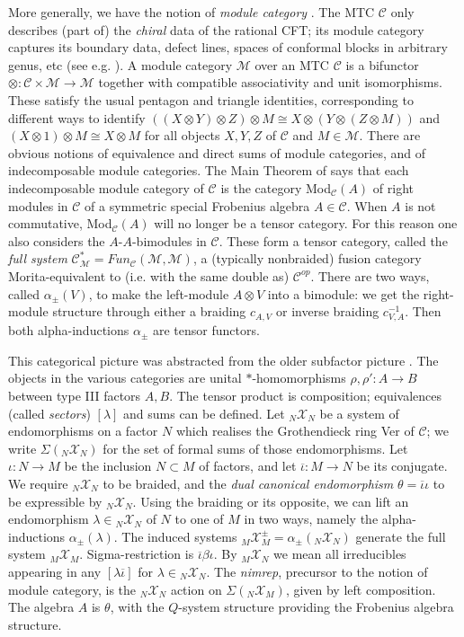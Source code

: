 \documentclass[12pt]{article}
\numberwithin{equation}{section}
\def\cC            {{\mathcal{C}}}
\def\cM            {{\mathcal{M}}}
\def\MXN           {{}_M {\mathcal{X}}_N}
\def\MXM           {{}_M {\mathcal{X}}_M}
\def\MXMpm         {{}_M^{} {\mathcal{X}}_M^\pm}
\def\NXN           {{}_N {\mathcal{X}}_N}
\def\NXM           {{}_N {\mathcal{X}}_M}
\begin{document}
More generally, we have the notion of \textit{module category} \cite{Ost1}. 
The MTC $\cC$ only describes (part of) the \textit{chiral} data of the rational CFT;  its module category  captures its boundary data, defect lines, spaces of conformal
blocks in arbitrary genus, etc (see e.g. \cite{FFSS}).  A module category $\cM$ over an MTC $\cC$
is a bifunctor $\otimes:\cC\times\cM\rightarrow\cM$ together with compatible associativity and unit
isomorphisms. These satisfy the usual pentagon and triangle identities, corresponding to different ways to 
identify $((X\otimes Y)\otimes Z)\otimes M\cong X\otimes(Y\otimes(Z\otimes M))$ and $(X\otimes 1)\otimes M\cong
X\otimes M$ for all objects $X,Y,Z$ of $\cC$ and $M\in\cM$. There are obvious notions of equivalence and direct sums
of module categories, and of indecomposable module categories. The Main Theorem of \cite{Ost1} says that each indecomposable module category of  $\cC$ is the category Mod$_\cC(A)$ of right modules in $\cC$ of a  symmetric special Frobenius algebra $A\in\cC$. When $A$ is not commutative, Mod$_\cC(A)$ will no longer be a tensor category. For this reason one also considers the  $A$-$A$-bimodules in $\cC$.
These form a tensor category, called the \textit{full system} $\cC^*_{\cM}=Fun_{\cC}(\cM,\cM)$, a (typically nonbraided) fusion category Morita-equivalent  to (i.e. with the same double as) $\cC^{op}$. There are two ways, called
$\alpha_\pm(V)$,  to make the left-module $A\otimes V$ into a bimodule: we get the right-module structure through either a braiding $c_{A,V}$ or inverse braiding $c_{V,A}^{-1}$. Then both alpha-inductions $\alpha_\pm$ are tensor functors.



This categorical picture was abstracted from the older subfactor picture \cite{LR,O,xu,BE1,BE4,BEK1,BEK2}. The objects in the various categories are unital $*$-homomorphisms
$\rho,\rho':A\rightarrow B$ between type III factors $A,B$. The tensor product is composition; equivalences (called \textit{sectors}) $[\lambda]$ and sums can be defined. Let  $\NXN$ be a system of endomorphisms on
 a factor $N$ which realises the Grothendieck ring  Ver of $\cC$; we write $\Sigma(\NXN)$ for the set of formal sums of those endomorphisms.  
Let $\iota:N\rightarrow M$ be the inclusion $N\subset M$ of factors, and let $\overline{\iota}:M\rightarrow N$ be its conjugate.
 We require   $\NXN$ to be braided, and  {the \textit{dual canonical endomorphism}} 
 $\theta=\overline{\iota}\iota$ to be expressible by $\NXN$.  Using the braiding  or its opposite, 
 we can lift an endomorphism $\lambda\in\NXN$
of $N$ to one of $M$ in two ways, namely the {alpha-inductions}  $\alpha_{\pm }(\lambda)$.  
The induced systems $\MXMpm=\alpha_\pm(\NXN)$
 generate  the {full system} $\MXM$.    Sigma-restriction is $\overline{\iota}\beta\iota$.
By  $\MXN$ we 
mean all irreducibles  appearing in any  $[\lambda\overline{\iota}]$ for
$\lambda\in\NXN$. The \textit{nimrep}, precursor to the notion of module category, is the $\NXN$ action on  {$\Sigma(\NXM)$}, given by left composition. The algebra $A$ 
is $\theta$, with the $Q$-system structure providing the Frobenius algebra structure.
\end{document}
